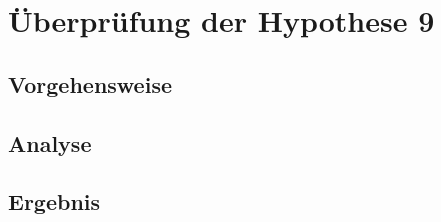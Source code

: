 \chapter{Überprüfung der Hypothese 9}

\section{Vorgehensweise}

\section{Analyse}

\section{Ergebnis}
